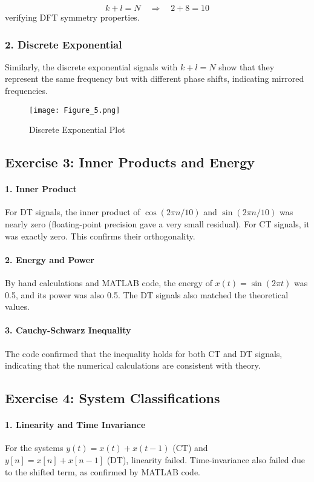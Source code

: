\documentclass[10pt, twocolumn]{article}
\begin{document}
\[
k + l = N \quad \Rightarrow \quad 2 + 8 = 10
\]
verifying DFT symmetry properties.

\subsubsection{2. Discrete Exponential}
Similarly, the discrete exponential signals with \(k + l = N\) show that they represent the same frequency but with different phase shifts, indicating mirrored frequencies.
\begin{figure}[h]
    \centering
    \texttt{[image: Figure\_5.png]}
    \caption{Discrete Exponential Plot}
    \label{fig:discrete exponential}
\end{figure}

\subsection{Exercise 3: Inner Products and Energy}

\paragraph{1. Inner Product}
For DT signals, the inner product of \(\cos(2\pi n/10)\) and \(\sin(2\pi n/10)\) was nearly zero (floating-point precision gave a very small residual). For CT signals, it was exactly zero. This confirms their orthogonality.

\paragraph{2. Energy and Power}
By hand calculations and MATLAB code, the energy of \(x(t) = \sin(2\pi t)\) was 0.5, and its power was also 0.5. The DT signals also matched the theoretical values. 

\paragraph{3. Cauchy-Schwarz Inequality}
The code confirmed that the inequality holds for both CT and DT signals, indicating that the numerical calculations are consistent with theory.

\subsection{Exercise 4: System Classifications}

\paragraph{1. Linearity and Time Invariance}
For the systems \(y(t) = x(t) + x(t - 1)\) (CT) and \(y[n] = x[n] + x[n - 1]\) (DT), linearity failed. Time-invariance also failed due to the shifted term, as confirmed by MATLAB code.
\end{document}
